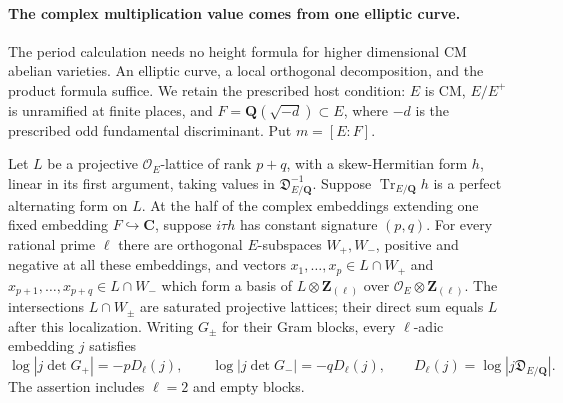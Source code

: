 \paragraph{The complex multiplication value comes from one elliptic curve.}
The period calculation needs no height formula for higher dimensional
CM abelian varieties. An elliptic curve, a local orthogonal decomposition,
and the product formula suffice. We retain the prescribed host condition:
$E$ is CM, $E/E^+$ is unramified at finite places, and
$F=\mathbf Q(\sqrt{-d})\subset E$, where $-d$ is the prescribed
odd fundamental discriminant. Put $m=[E:F]$.

\begin{lemma}\label{geo-pure-cm-local-basis}
Let $L$ be a projective $\mathcal O_E$-lattice of rank $p+q$,
with a skew-Hermitian form $h$, linear in its first argument,
taking values in
$\mathfrak D_{E/\mathbf Q}^{-1}$. Suppose
$\operatorname{Tr}_{E/\mathbf Q}h$ is a perfect alternating
form on $L$. At the half of the complex embeddings extending
one fixed embedding $F\hookrightarrow\mathbf C$, suppose
$i\tau h$ has constant signature $(p,q)$.
For every rational prime $\ell$ there are orthogonal $E$-subspaces
$W_+,W_-$, positive and negative at all these embeddings, and
vectors $x_1,\ldots,x_p\in L\cap W_+$ and
$x_{p+1},\ldots,x_{p+q}\in L\cap W_-$ which form a basis of
$L\otimes\mathbf Z_{(\ell)}$ over
$\mathcal O_E\otimes\mathbf Z_{(\ell)}$.
The intersections $L\cap W_\pm$ are saturated projective lattices;
their direct sum equals $L$ after this localization.
Writing $G_\pm$ for their Gram blocks, every $\ell$-adic embedding
$j$ satisfies
\[
 \log|j\det G_+|=-pD_\ell(j),\qquad
 \log|j\det G_-|=-qD_\ell(j),\qquad
 D_\ell(j)=\log|j\mathfrak D_{E/\mathbf Q}|.
\]
The assertion includes $\ell=2$ and empty blocks.
\end{lemma}
